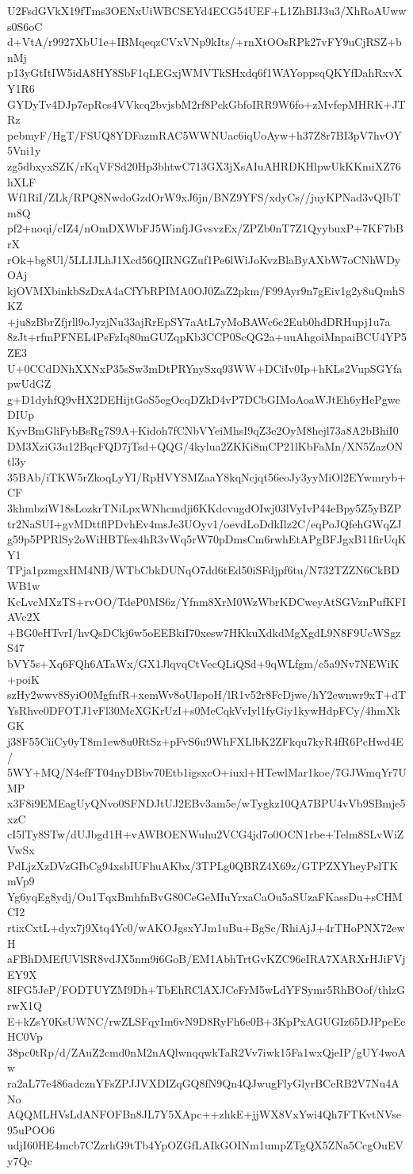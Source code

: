 U2FsdGVkX19fTms3OENxUiWBCSEYd4ECG54UEF+L1ZhBIJ3u3/XhRoAUwws0S6oC
d+VtA/r9927XbU1e+IBMqeqzCVxVNp9kIts/+rnXtOOsRPk27vFY9uCjRSZ+bnMj
p13yGtItIW5idA8HY8SbF1qLEGxjWMVTkSHxdq6f1WAYoppsqQKYfDahRxvXY1R6
GYDyTv4DJp7epRcs4VVkcq2bvjsbM2rf8PckGbfoIRR9W6fo+zMvfepMHRK+JTRz
pebmyF/HgT/FSUQ8YDFazmRAC5WWNUac6iqUoAyw+h37Z8r7BI3pV7hvOY5Vni1y
zg5dbxyxSZK/rKqVFSd20Hp3bhtwC713GX3jXsAIuAHRDKHlpwUkKKmiXZ76hXLF
Wf1RiI/ZLk/RPQ8NwdoGzdOrW9xJ6jn/BNZ9YFS/xdyCs//juyKPNad3vQIbTm8Q
pf2+noqi/cIZ4/nOmDXWbFJ5WinfjJGvsvzEx/ZPZb0nT7Z1QyybuxP+7KF7bBrX
rOk+bg8Ul/5LLIJLhJ1Xcd56QIRNGZuf1Pe6lWiJoKvzBlaByAXbW7oCNhWDyOAj
kjOVMXbinkbSzDxA4aCfYbRPIMA0OJ0ZaZ2pkm/F99Ayr9n7gEiv1g2y8uQmhSKZ
+ju8zBbrZfjrll9oJyzjNu33ajRrEpSY7aAtL7yMoBAWc6c2Eub0hdDRHupj1u7a
8zJt+rfmPFNEL4PsFzIq80mGUZqpKb3CCP0ScQG2a+uuAhgoiMnpaiBCU4YP5ZE3
U+0CCdDNhXXNxP35sSw3mDtPRYnySxq93WW+DCiIv0Ip+hKLs2VupSGYfapwUdGZ
g+D1dyhfQ9vHX2DEHijtGoS5egOcqDZkD4vP7DCbGIMoAoaWJtEh6yHePgweDIUp
KyvBmGliFybBsRg7S9A+Kidoh7fCNbVYeiMhsI9qZ3e2OyM8hejl73a8A2bBhiI0
DM3XziG3u12BqcFQD7jTsd+QQG/4kylua2ZKKi8mCP21lKbFaMn/XN5ZazONtl3y
35BAb/iTKW5rZkoqLyYI/RpHVYSMZaaY8kqNcjqt56eoJy3yyMiOl2EYwmryb+CF
3khmbziW18sLozkrTNiLpxWNhcmdji6KKdcvugdOIwj03lVyIvP44eBpy5Z5yBZP
tr2NaSUI+gvMDttflPDvhEv4msJe3UOyv1/oevdLoDdkIlz2C/eqPoJQfehGWqZJ
g59p5PPRlSy2oWiHBTfex4hR3vWq5rW70pDmsCm6rwhEtAPgBFJgxB11firUqKY1
TPja1pzmgxHM4NB/WTbCbkDUNqO7dd6tEd50iSFdjpf6tu/N732TZZN6CkBDWB1w
KcLvcMXzTS+rvOO/TdeP0MS6z/Yfnm8XrM0WzWbrKDCweyAtSGVznPufKFIAVc2X
+BG0eHTvrI/hvQsDCkj6w5oEEBkiI70xesw7HKkuXdkdMgXgdL9N8F9UcWSgzS47
bVY5s+Xq6FQh6ATaWx/GX1JlqvqCtVecQLiQSd+9qWLfgm/c5a9Nv7NEWiK+poiK
szHy2wwv8SyiO0MgfnfR+xemWv8oUIspoH/lR1v52r8FcDjwe/hY2ewnwr9xT+dT
YsRhve0DFOTJ1vFl30McXGKrUzI+s0MeCqkVvIyl1fyGiy1kywHdpFCy/4hmXkGK
j38F55CiiCy0yT8m1ew8u0RtSz+pFvS6u9WhFXLlbK2ZFkqu7kyR4fR6PcHwd4E/
5WY+MQ/N4efFT04nyDBbv70Etb1igsxcO+iuxl+HTewlMar1koe/7GJWmqYr7UMP
x3F8i9EMEagUyQNvo0SFNDJtUJ2EBv3am5e/wTygkz10QA7BPU4vVb9SBmje5xzC
cI5lTy8STw/dUJbgd1H+vAWBOENWuhu2VCG4jd7o0OCN1rbe+Telm8SLvWiZVwSx
PdLjzXzDVzGIbCg94xsbIUFhuAKbx/3TPLg0QBRZ4X69z/GTPZXYheyPslTKmVp9
Yg6yqEg8ydj/Ou1TqxBmhfnBvG80CeGeMIuYrxaCaOu5aSUzaFKassDu+sCHMCI2
rtixCxtL+dyx7j9Xtq4Yc0/wAKOJgsxYJm1uBu+BgSc/RhiAjJ+4rTHoPNX72ewH
aFBhDMEfUVlSR8vdJX5nm9i6GoB/EM1AbhTrtGvKZC96eIRA7XARXrHJiFVjEY9X
8IFG5JeP/FODTUYZM9Dh+TbEhRClAXJCeFrM5wLdYFSymr5RhBOof/thlzGrwX1Q
E+kZsY0KsUWNC/rwZLSFqyIm6vN9D8RyFh6e0B+3KpPxAGUGIz65DJPpeEeHC0Vp
38pc0tRp/d/ZAuZ2cmd0nM2nAQlwnqqwkTaR2Vv7iwk15Fa1wxQjeIP/gUY4woAw
ra2aL77e486adcznYFsZPJJVXDIZqGQ8fN9Qn4QJwugFlyGlyrBCeRB2V7Nu4ANo
AQQMLHVsLdANFOFBn8JL7Y5XApc++zhkE+jjWX8VxYwi4Qh7FTKvtNVse95uPOO6
udjI60HE4mcb7CZzrhG9tTb4YpOZGfLAIkGOINm1umpZTgQX5ZNa5CcgOuEVy7Qc
